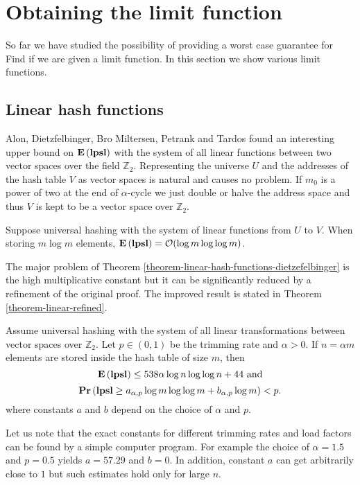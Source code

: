 \section{Obtaining the limit function}
\label{section-limit}

So far we have studied the possibility of providing a worst case guarantee for Find if we are given a limit function. 
In this section we show various limit functions.

\subsection{Linear hash functions}
Alon, Dietzfelbinger, Bro Miltersen, Petrank and Tardos \cite{DBLP:journals/jacm/AlonDMPT99} found an interesting upper bound on $\mathbf{E}\left(\mathbf{lpsl}\right)$ with the system of all linear functions between two vector spaces over the field $\mathbb{Z}_2$. 
Representing the universe $U$ and the addresses of the hash table $V$ as vector spaces is natural and causes no problem. 
If $m_0$ is a power of two at the end of $\alpha$-cycle we just double or halve the address space and thus $V$ is kept to be a vector space over $\mathbb{Z}_2$.

\begin{theorem}
\label{theorem-linear-hash-functions-dietzefelbinger}
Suppose universal hashing with the system of linear functions from $U$ to $V$. 
When storing $m \log m$ elements, $\mathbf{E}\left(\mathbf{lpsl}\right) = \mathcal{O}(\log m \log \log m)$. 
\end{theorem}

The major problem of Theorem \ref{theorem-linear-hash-functions-dietzefelbinger} is the high multiplicative constant but it can be significantly reduced by a refinement of the original proof. The improved result is stated in Theorem \ref{theorem-linear-refined}.

\begin{theorem}
\label{theorem-linear-refined}
Assume universal hashing with the system of all linear transformations between vector spaces over $\mathbb{Z}_2$. 
Let $p \in (0, 1)$ be the trimming rate and $\alpha > 0$. 
If $n = \alpha m$ elements are stored inside the hash table of size $m$, then $$\mathbf{E}\left(\mathbf{lpsl}\right) \leq 538 \alpha \log n \log \log n + 44\mbox{ and}$$ $$\mathbf{Pr}\left(\mathbf{lpsl} \geq a_{\alpha, p} \log m \log \log m + b_{\alpha, p}\log m\right) < p.$$ where constants $a$ and $b$ depend on the choice of $\alpha$ and $p$.
\end{theorem}

Let us note that the exact constants for different trimming rates and load factors can be found by a simple computer program.
For example the choice of $\alpha = 1.5$ and $p = 0.5$ yields $a = 57.29$ and $b = 0$.
In addition, constant $a$ can get arbitrarily close to $1$ but such estimates hold only for large $n$.

